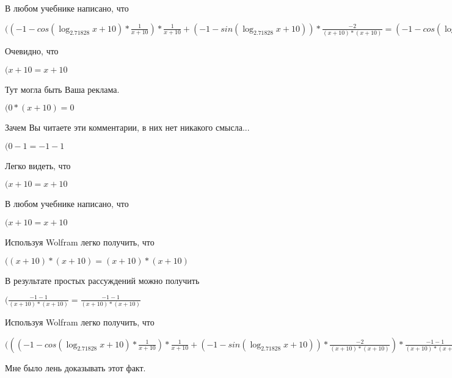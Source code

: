 \documentclass[12pt,a4paper,fleqn]{article}
\theoremstyle{definition}
\begin{document}
В любом учебнике написано, что

$(( -1  - cos(\log_{ 2.71828 }{ x  +  10 }) * \frac{ 1 }{ x  +  10 }
) * \frac{ 1 }{ x  +  10 }
 + ( -1  - sin(\log_{ 2.71828 }{ x  +  10 })) * \frac{ -2 }{( x  +  10 ) * ( x  +  10 )}
 = ( -1  - cos(\log_{ 2.71828 }{ x  +  10 }) * \frac{ 1 }{ x  +  10 }
) * \frac{ 1 }{ x  +  10 }
 + ( -1  - sin(\log_{ 2.71828 }{ x  +  10 })) * \frac{ -2 }{( x  +  10 ) * ( x  +  10 )}
$

Очевидно, что

$( x  +  10  =  x  +  10 $

Тут могла быть Ваша реклама.

$( 0  * ( x  +  10 ) =  0 $

Зачем Вы читаете эти комментарии, в них нет никакого смысла...

$( 0  -  1  =  -1  -  1 $

Легко видеть, что

$( x  +  10  =  x  +  10 $

В любом учебнике написано, что

$( x  +  10  =  x  +  10 $

Используя Wolfram легко получить, что

$(( x  +  10 ) * ( x  +  10 ) = ( x  +  10 ) * ( x  +  10 )$

В результате простых рассуждений можно получить

$(\frac{ -1  -  1 }{( x  +  10 ) * ( x  +  10 )}
 = \frac{ -1  -  1 }{( x  +  10 ) * ( x  +  10 )}
$

Используя Wolfram легко получить, что

$((( -1  - cos(\log_{ 2.71828 }{ x  +  10 }) * \frac{ 1 }{ x  +  10 }
) * \frac{ 1 }{ x  +  10 }
 + ( -1  - sin(\log_{ 2.71828 }{ x  +  10 })) * \frac{ -2 }{( x  +  10 ) * ( x  +  10 )}
) * \frac{ -1  -  1 }{( x  +  10 ) * ( x  +  10 )}
 = (( -1  - cos(\log_{ 2.71828 }{ x  +  10 }) * \frac{ 1 }{ x  +  10 }
) * \frac{ 1 }{ x  +  10 }
 + ( -1  - sin(\log_{ 2.71828 }{ x  +  10 })) * \frac{ -2 }{( x  +  10 ) * ( x  +  10 )}
) * \frac{ -1  -  1 }{( x  +  10 ) * ( x  +  10 )}
$

Мне было лень доказывать этот факт.
\end{document}
